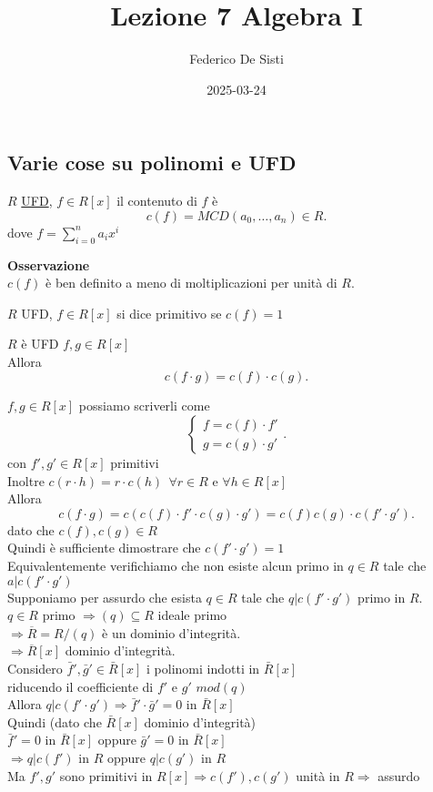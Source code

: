 \documentclass[12px]{article}
\title{Lezione 7 Algebra I}
\date{2025-03-24}
\author{Federico De Sisti}
\begin{document}
\maketitle
\newpage
\subsection{Varie cose su polinomi e UFD}
\begin{defi}
	$R$ \underline{UFD}, $f\in R[x]$ il contenuto di $f$ è 
	\[
		c(f) = MCD(a_0,\ldots,a_n)\in R
	.\] 
	dove $f = \sum^{n}_{i=0}a_ix^i$
\end{defi}
\textbf{Osservazione}\\
$c(f)$ è ben definito a meno di moltiplicazioni per unità di  $R$.
\begin{defi}
	$R$ UFD, $f\in R[x]$ si dice primitivo se  $c(f) = 1$
\end{defi}
\begin{lemm}[Gauss]
	$R$ è UFD $f,g\in R[x]$\\
	Allora
	\[
		c(f\cdot g) = c(f)\cdot c(g)
	.\] 
\end{lemm}
\begin{dimo}
	$f,g\in R[x]$ possiamo scriverli come
	\[
		\begin{cases}
			f = c(f)\cdot f'\\
			g = c(g)\cdot g'
		\end{cases}
	.\] 
	con $f',g'\in R[x]$ primitivi\\
	Inoltre  $c(r\cdot h) = r\cdot c(h) \ \ \forall r\in R$ e  $\forall h\in R[x]$ \\
	Allora \\
	\[
		c(f\cdot g) = c(c(f)\cdot f'\cdot c(g)\cdot g')= c(f)c(g)\cdot c(f'\cdot g')
	.\] 
	dato che $c(f),c(g)\in R$ \\
	Quindi è sufficiente dimostrare che $c(f'\cdot g') = 1$\\
	Equivalentemente verifichiamo che non esiste alcun primo in $q\in R$ tale che $a | c(f'\cdot g')$\\
	Supponiamo per assurdo che esista  $q\in R$ tale che  $q | c(f'\cdot g')$ primo  in  $R$.\\
	$q\in R$ primo  $ \Rightarrow (q)\subseteq R$ ideale primo\\
	$ \Rightarrow \overline R = R/(q)$ è un dominio d'integrità.\\
	$ \Rightarrow \overline R [x]$ dominio d'integrità.\\
	Considero $\bar f', \bar g'\in \bar R[x]$  i polinomi indotti in  $\bar R[x]$ \\riducendo il coefficiente di $f'$ e $g'$ $mod(q)$ \\
	Allora $q|c (f'\cdot g') \Rightarrow \bar f'\cdot \bar g' = 0$ in $\bar R[x]$\\
	Quindi  (dato che $\bar R[x]$ dominio d'integrità)\\ $\bar f' = 0 $ in  $\bar R[x]$ oppure  $\bar g' = 0$ in  $\bar R[x]$ \\
	$ \Rightarrow q | c(f') $ in $R$ oppure  $q | c(g')$ in $R$\\
	Ma  $f',g'$ sono primitivi in  $R[x] \Rightarrow  c(f'),c(g') $ unità in $R \Rightarrow $ assurdo\\
\end{dimo}
\end{document}
